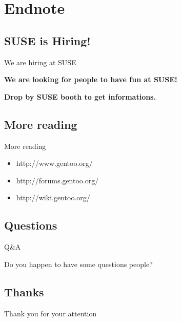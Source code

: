 \documentclass{beamer}
\begin{document}
\section{Endnote}

\subsection{SUSE is Hiring!}

\begin{frame}{We are hiring at SUSE}
	\begin{center}\bf{We are looking for people to have fun at SUSE!}\end{center}
	\begin{center}\bf{Drop by SUSE booth to get informations.}\end{center}
\end{frame}

\subsection{More reading}
\begin{frame}{More reading}
	\begin{itemize}
		\item http://www.gentoo.org/
		\item http://forums.gentoo.org/
		\item http://wiki.gentoo.org/
	\end{itemize}
\end{frame}

\subsection{Questions}
\begin{frame}{Q\&A}
	\begin{center}Do you happen to have some questions people?\end{center}
\end{frame}

\subsection{Thanks}
\begin{frame}{}
	\begin{center}Thank you for your attention\end{center}
\end{frame}
\end{document}

